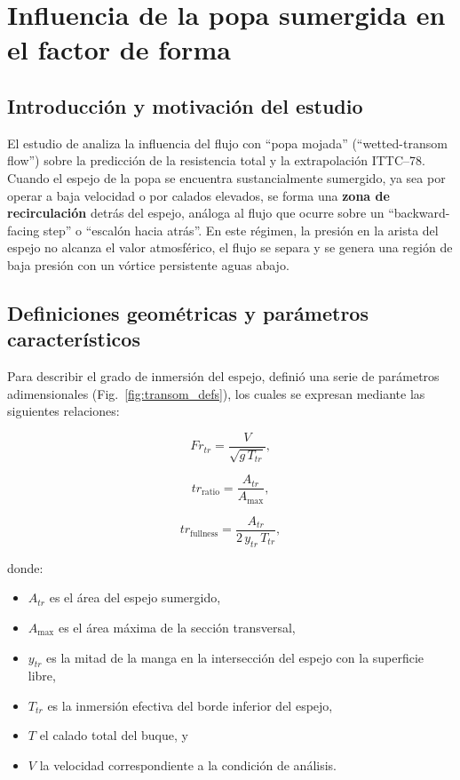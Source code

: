 \section{Influencia de la popa sumergida en el factor de forma}\label{sec:popa_sumergida}

\subsection{Introducción y motivación del estudio}

El estudio de \cite{korkmaz_wetted_transom} analiza la influencia del flujo con ``popa mojada'' (``wetted-transom flow'') sobre la predicción de la resistencia total y la extrapolación ITTC--78.  
Cuando el espejo de la popa se encuentra sustancialmente sumergido, ya sea por operar a baja velocidad o por calados elevados, se forma una \textbf{zona de recirculación} detrás del espejo, análoga al flujo que ocurre sobre un ``backward-facing step'' o ``escalón hacia atrás''.  
En este régimen, la presión en la arista del espejo no alcanza el valor atmosférico, el flujo se separa y se genera una región de baja presión con un vórtice persistente aguas abajo.

\subsection{Definiciones geométricas y parámetros característicos}

Para describir el grado de inmersión del espejo, \cite{korkmaz_wetted_transom} definió una serie de parámetros adimensionales (Fig.~\ref{fig:transom_defs}), los cuales se expresan mediante las siguientes relaciones:

\begin{equation}
Fr_{tr} = \frac{V}{\sqrt{g\,T_{tr}}},
\end{equation}

\begin{equation}
tr_{\text{ratio}} = \frac{A_{tr}}{A_{\max}},
\end{equation}

\begin{equation}
tr_{\text{fullness}} = \frac{A_{tr}}{2\,y_{tr}\,T_{tr}},
\end{equation}

donde:
\begin{itemize}
  \item $A_{tr}$ es el área del espejo sumergido,
  \item $A_{\max}$ es el área máxima de la sección transversal,
  \item $y_{tr}$ es la mitad de la manga en la intersección del espejo con la superficie libre,
  \item $T_{tr}$ es la inmersión efectiva del borde inferior del espejo,
  \item $T$ el calado total del buque, y
  \item $V$ la velocidad correspondiente a la condición de análisis.
\end{itemize}

